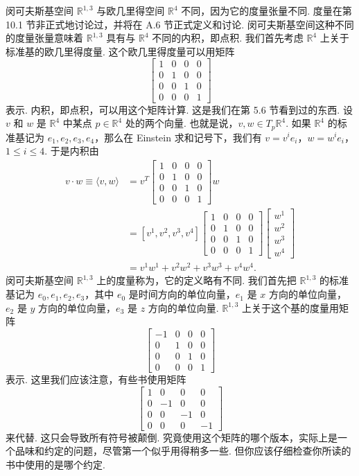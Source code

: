 闵可夫斯基空间 $\mathbb{R}^{1,3}$ 与欧几里得空间 $\mathbb{R}^4$ 不同，因为它的度量张量不同. 度量在第 10.1 节非正式地讨论过，并将在 A.6 节正式定义和讨论. 闵可夫斯基空间这种不同的度量张量意味着 $\mathbb{R}^{1,3}$ 具有与 $\mathbb{R}^4$ 不同的内积，即点积. 我们首先考虑 $\mathbb{R}^4$ 上关于标准基的欧几里得度量. 这个欧几里得度量可以用矩阵
\[
\begin{bmatrix}
1&0&0&0\\
0&1&0&0\\
0&0&1&0\\
0&0&0&1
\end{bmatrix}
\]
表示. 内积，即点积，可以用这个矩阵计算. 这是我们在第 5.6 节看到过的东西. 设 $v$ 和 $w$ 是 $\mathbb{R}^4$ 中某点 $p\in\mathbb{R}^4$ 处的两个向量. 也就是说，$v,w\in T_p\mathbb{R}^4$. 如果 $\mathbb{R}^4$ 的标准基记为 $e_1,e_2,e_3,e_4$，那么在 Einstein 求和记号下，我们有 $v=v^ie_i$，$w=w^ie_i$，$1\leq i\leq4$. 于是内积由
\[
\begin{aligned}
v\cdot w\equiv\langle v,w\rangle
&=v^T\begin{bmatrix}1&0&0&0\\0&1&0&0\\0&0&1&0\\0&0&0&1\end{bmatrix}w\\
&=[v^1,v^2,v^3,v^4]\begin{bmatrix}1&0&0&0\\0&1&0&0\\0&0&1&0\\0&0&0&1\end{bmatrix}\begin{bmatrix}w^1\\w^2\\w^3\\w^4\end{bmatrix}\\
&=v^1w^1+v^2w^2+v^3w^3+v^4w^4 .
\end{aligned}
\]
闵可夫斯基空间 $\mathbb{R}^{1,3}$ 上的度量称为，它的定义略有不同. 我们首先把 $\mathbb{R}^{1,3}$ 的标准基记为 $e_0,e_1,e_2,e_3$，其中 $e_0$ 是时间方向的单位向量，$e_1$ 是 $x$ 方向的单位向量，$e_2$ 是 $y$ 方向的单位向量，$e_3$ 是 $z$ 方向的单位向量. $\mathbb{R}^{1,3}$ 上关于这个基的度量用矩阵
\[
\begin{bmatrix}
-1&0&0&0\\
0&1&0&0\\
0&0&1&0\\
0&0&0&1
\end{bmatrix}
\]
表示. 这里我们应该注意，有些书使用矩阵
\[
\begin{bmatrix}
1&0&0&0\\
0&-1&0&0\\
0&0&-1&0\\
0&0&0&-1
\end{bmatrix}
\]
来代替. 这只会导致所有符号被颠倒. 究竟使用这个矩阵的哪个版本，实际上是一个品味和约定的问题，尽管第一个似乎用得稍多一些. 但你应该仔细检查你所读的书中使用的是哪个约定.

